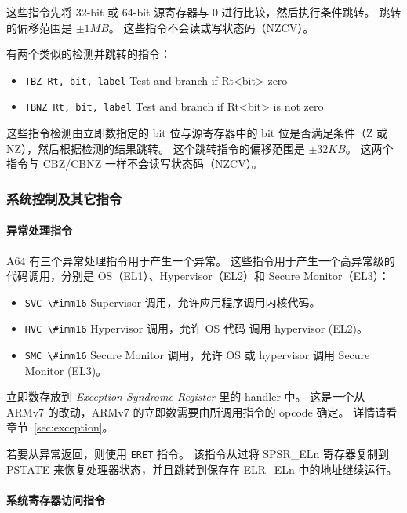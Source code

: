 这些指令先将 32-bit 或 64-bit 源寄存器与 0 进行比较，然后执行条件跳转。
跳转的偏移范围是 $\pm1MB$。
这些指令不会读或写状态码（NZCV）。

有两个类似的检测并跳转的指令：

\begin{itemize}
  \item \lstinline!TBZ Rt, bit, label! \quad Test and branch if Rt<bit> zero
  \item \lstinline!TBNZ Rt, bit, label! \quad Test and branch if Rt<bit> is not zero
\end{itemize}

这些指令检测由立即数指定的 bit 位与源寄存器中的 bit 位是否满足条件（Z 或 NZ），然后根据检测的结果跳转。
这个跳转指令的偏移范围是 $\pm32KB$。
这两个指令与 CBZ/CBNZ 一样不会读写状态码（NZCV）。

\subsubsection{系统控制及其它指令}

\paragraph*{异常处理指令}

A64 有三个异常处理指令用于产生一个异常。
这些指令用于产生一个高异常级的代码调用，分别是 OS（EL1）、Hypervisor（EL2）和 Secure Monitor（EL3）：

\begin{itemize}
  \item \lstinline!SVC \#imm16! \quad Supervisor 调用，允许应用程序调用内核代码。
  \item \lstinline!HVC \#imm16! \quad Hypervisor 调用，允许 OS 代码 调用 hypervisor (EL2)。
  \item \lstinline!SMC \#imm16! \quad Secure Monitor 调用，允许 OS 或 hypervisor 调用 Secure Monitor (EL3)。
\end{itemize}

立即数存放到 \textit{Exception Syndrome Register} 里的 handler 中。
这是一个从 ARMv7 的改动，ARMv7 的立即数需要由所调用指令的 opcode 确定。
详情请看章节~\ref{sec:exception}。

若要从异常返回，则使用 \lstinline!ERET! 指令。
该指令从过将 SPSR\_ELn 寄存器复制到 PSTATE 来恢复处理器状态，并且跳转到保存在 ELR\_ELn 中的地址继续运行。

\paragraph*{系统寄存器访问指令}

